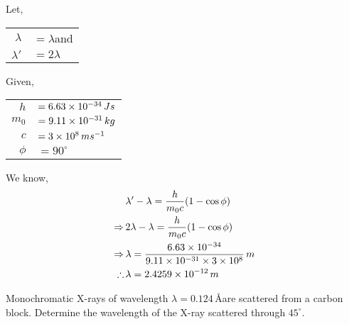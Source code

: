 \documentclass[../main.tex]{subfiles}
\begin{document}
\begin{soln}
    Let,
    \begin{table}[H]
        \begin{tabular}{rl}
            \hspace{2.5cm}$ \lambda $ & $ =\lambda $\qquad and \\
            $ \lambda'$               & $ =2\lambda $
        \end{tabular}
    \end{table}
    Given,
    \begin{table}[H]
        \begin{tabular}{rl}
            \hspace{2.5cm}$ h $ & $ =6.63\times 10^{-34}\,Js $ \\
            $ m_0$              & $ =9.11\times 10^{-31}\,kg $ \\
            $ c$                & $ =3\times 10^{8}\,ms^{-1} $ \\
            $ \phi$             & $ =90^\circ $
        \end{tabular}
    \end{table}
    We know,
    \begin{align*}
                      & \lambda' -\lambda=\frac{h}{m_0c}(1-\cos \phi)         \\
        \Rightarrow\, & 2\lambda -\lambda=\frac{h}{m_0c}(1-\cos \phi)         \\
        \Rightarrow\, & \lambda=\frac{6.63\times 10^{-34}}{9.11\times 10^{-31}\times 3\times 10^{8}}\,m \\
        \therefore \, & \lambda=2.4259\times 10^{-12}\,m
    \end{align*}
\end{soln}
\newpage
\begin{prob}
    Monochromatic X-rays of wavelength $ \lambda= 0.124\,$\AA are scattered from a carbon block. Determine the wavelength of the X-ray scattered through $ 45^\circ $.
\end{prob}
\end{document}
